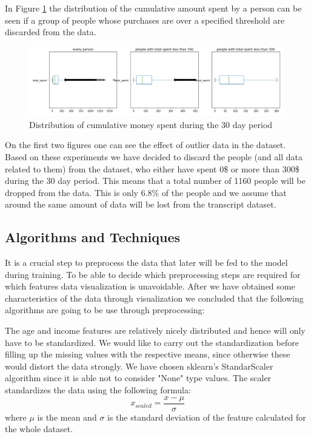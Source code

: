 In Figure \ref{fig8} the distribution of the cumulative amount spent by a person can be seen if a group of people whose purchases are over a specified threshold are discarded from the data.

\begin{figure}[h]
	\centering
	\includegraphics[width=0.99\textwidth]{fig/transaction_distribution_2.jpg}
	\vspace*{-0.1in}
	\caption{Distribution of cumulative money spent during the 30 day period}
	\label{fig8}
	\vspace*{-0.2in}
	\bigskip
\end{figure}

On the first two figures one can see the effect of outlier data in the dataset. Based on these experiments we have decided to discard the people (and all data related to them) from the dataset, who either have spent 0\$ or more than 300\$ during the 30 day period. This means that a total number of 1160 people will be dropped from the data. This is only 6.8\% of the people and we assume that around the same amount of data will be lost from the transcript dataset.

\subsection{Algorithms and Techniques}\label{sec2.3}

It is a crucial step to preprocess the data that later will be fed to the model during training. To be able to decide which preprocessing steps are required for which features data visualization is unavoidable. After we have obtained some characteristics of the data through visualization we concluded that the following algorithms are going to be use through preprocessing:

The age and income features are relatively nicely distributed and hence will only have to be standardized. We would like to carry out the standardization before filling up the missing values with the respective means, since otherwise these would distort the data strongly. We have chosen sklearn's StandarScaler algorithm since it is able not to consider "None" type values. The scaler standardizes the data using the following formula:
$$x_{scaled} = \frac{x - \mu}{\sigma}$$
where $\mu$ is the mean and $\sigma$ is the standard deviation of the feature calculated for the whole dataset.

